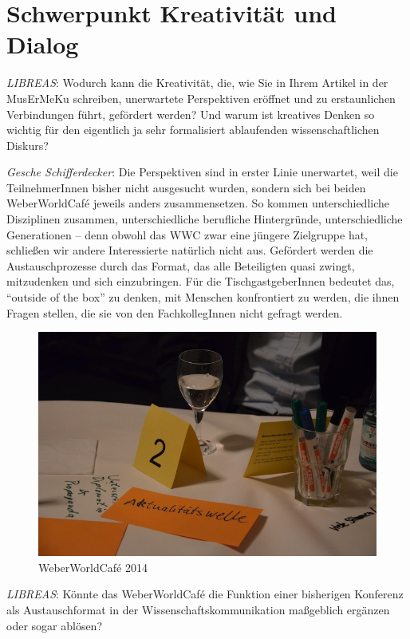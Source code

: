 \documentclass[a4paper,
fontsize=11pt,
oneside,
numbers=noperiodatend,
parskip=half-,
bibliography=totoc,
final
]{scrartcl}
\begin{document}
\section*{Schwerpunkt Kreativität und
Dialog}\label{schwerpunkt-kreativituxe4t-und-dialog}

\emph{LIBREAS}: Wodurch kann die Kreativität, die, wie Sie in Ihrem
Artikel in der MusErMeKu schreiben, unerwartete Perspektiven eröffnet
und zu erstaunlichen Verbindungen führt, gefördert werden? Und warum ist
kreatives Denken so wichtig für den eigentlich ja sehr formalisiert
ablaufenden wissenschaftlichen Diskurs?

\emph{Gesche Schifferdecker}: Die Perspektiven sind in erster Linie
unerwartet, weil die TeilnehmerInnen bisher nicht ausgesucht wurden,
sondern sich bei beiden WeberWorldCafé jeweils anders zusammensetzen. So
kommen unterschiedliche Disziplinen zusammen, unterschiedliche
berufliche Hintergründe, unterschiedliche Generationen -- denn obwohl
das WWC zwar eine jüngere Zielgruppe hat, schließen wir andere
Interessierte natürlich nicht aus. Gefördert werden die
Austauschprozesse durch das Format, das alle Beteiligten quasi zwingt,
mitzudenken und sich einzubringen. Für die TischgastgeberInnen bedeutet
das, \enquote{outside of the box} zu denken, mit Menschen konfrontiert
zu werden, die ihnen Fragen stellen, die sie von den FachkollegInnen
nicht gefragt werden.

\begin{figure}[htbp]
\centering
\includegraphics{wwc2.jpg}
\caption{WeberWorldCafé 2014}
\end{figure}

\emph{LIBREAS}: Könnte das WeberWorldCafé die Funktion einer bisherigen
Konferenz als Austauschformat in der Wissenschaftskommunikation
maßgeblich ergänzen oder sogar ablösen?
\end{document}
